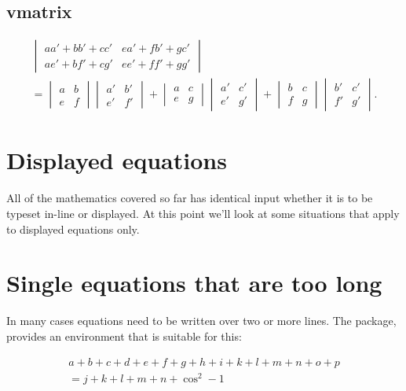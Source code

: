 \subsection{vmatrix}
\begin{gather*}
\begin{vmatrix}
aa' + bb' + cc' & ea' + fb' + gc' \\
ae' + bf' + cg' & ee' + ff' + gg'
\end{vmatrix} \\
%
{} = \begin{vmatrix}
a & b \\
e & f
\end{vmatrix}  \begin{vmatrix}
a' & b' \\
e' & f'
\end{vmatrix} + \begin{vmatrix}
a & c \\
e & g
\end{vmatrix}  \begin{vmatrix}
a' & c' \\
e' & g'
\end{vmatrix} + \begin{vmatrix}
b & c \\
f & g
\end{vmatrix}  \begin{vmatrix}
b' & c' \\
f' & g'
\end{vmatrix}.
\end{gather*}


\section{Displayed equations}
All of the mathematics covered so far has identical input whether it is to be typeset
in-line or displayed. At this point we’ll look at some situations that apply to displayed
equations only.





\section{Single equations that are too long}

In many cases equations need to be written over two or more lines. The  package, provides an environment that is suitable for this:

\begin{teXXX}
\begin{multline}
   a + b + c + d + e + f+ g + h + i  + k + l + m + n + o + p\\
              = j + k + l + m + n +\cos^{2}-1
\end{multline}
\end{teXXX}

